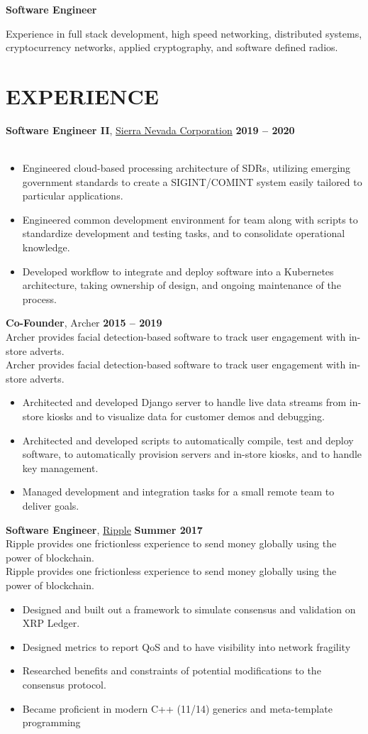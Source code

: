 \documentclass[10pt, center]{res} %
\newcommand{\pad}{\vspace{2pt}}
\newcommand{\unpad}{\vspace{-2pt}}
\newcommand{\bullets}[1]{
	\begin{itemize}[noitemsep]
		#1
	\end{itemize}
	\vspace{-6pt}
}
\newcommand{\experience}[5]{
	{\bf #1}, #2 \hfill {\bf #3} \\ \vspace{-10pt}
	\ifx\hfbuzz#4\hfbuzz
		\vspace{-4pt}
	\else
		{\vspace{-4pt} \\ #4}
	\fi
	\bullets{#5}
}
\begin{document}
\newcommand{\email}{\href{mailto:jmmcgee.00@gmail.com}{jmmcgee.00@gmail.com} }
\newcommand{\phone}{\href{tel:+1-213-646-1070}{(213) 646-1070} }
\address{\email | \phone}
\begin{resume}

\pad
\centerline{\textbf{\huge Software Engineer}}
\parbox{\textwidth}{
	Experience in full stack development, high speed networking, distributed systems, cryptocurrency networks, applied cryptography, and software defined radios.
}

\unpad
\section{EXPERIENCE}
	\experience {Software Engineer II}{\href{https://www.sncorp.com}{Sierra Nevada Corporation}}{2019 -- 2020}{}{
	\item Engineered cloud-based processing architecture of SDRs, utilizing emerging government standards to create a SIGINT/COMINT system easily tailored to particular applications.
	\item Engineered common development environment for team along with scripts to standardize development and testing tasks, and to consolidate operational knowledge.
	\item Developed workflow to integrate and deploy software into a Kubernetes architecture, taking ownership of design, and ongoing maintenance of the process.
	}

	\experience{Co-Founder}{Archer}{2015 -- 2019}{
	Archer provides facial detection-based software to track user engagement with in-store adverts.}{
		\item Architected and developed Django server to handle live data streams from in-store kiosks and to visualize data for customer demos and debugging.
		\item Architected and developed scripts to automatically compile, test and deploy software, to automatically provision servers and in-store kiosks, and to handle key management.
		\item Managed development and integration tasks for a small remote team to deliver goals.
	}

    \experience{Software Engineer}{\href{https://ripple.com/}{Ripple}}{Summer 2017}{
   	Ripple provides one frictionless experience to send money globally using the power of blockchain.}{
		\item Designed and built out a framework to simulate consensus and validation on XRP Ledger.
		\item Designed metrics to report QoS and  to have visibility into network fragility
		\item Researched benefits and constraints of potential modifications to the consensus protocol.
		\item Became proficient in modern C++ (11/14) generics and meta-template programming
    }


\end{resume}
\end{document}
